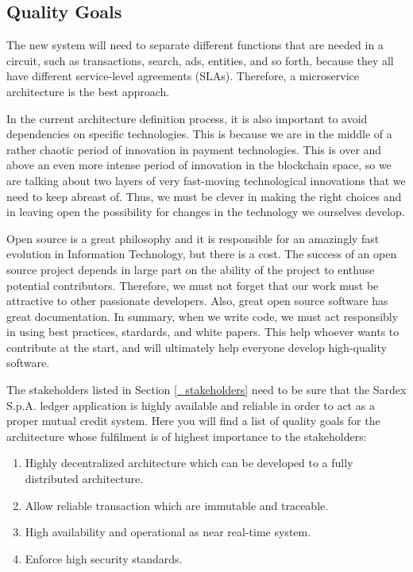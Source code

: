 \subsection{Quality Goals}\label{_quality_goals}
The new system will need to separate different functions that are needed in a circuit, such as transactions, search, ads, entities, and so forth, because they all have different service-level agreements (SLAs). Therefore, a microservice architecture is the best approach.

In the current architecture definition process, it is also important to avoid dependencies on specific technologies. This is because we are in the middle of a rather chaotic period of innovation in payment technologies. This is over and above an even more intense period of innovation in the blockchain space, so we are talking about two layers of very fast-moving technological innovations that we need to keep abreast of. Thus, we must be clever in making the right choices and in leaving open the possibility for changes in the technology we ourselves develop.

Open source is a great philosophy and it is responsible for an amazingly fast evolution in Information Technology, but there is a cost. The success of an open source project depends in large part on the ability of the project to enthuse potential contributors. Therefore, we must not forget that our work must be attractive to other passionate developers. Also, great open source software has great documentation. In summary, when we write code, we must act responsibly in using best practices, stardards, and white papers. This help whoever wants to contribute at the start, and will ultimately help everyone develop high-quality software.

The stakeholders listed in Section \ref{_stakeholders} need to be sure that the Sardex S.p.A. ledger application is highly available and reliable in order to act as a proper mutual credit system. Here you will find a list of quality goals for the architecture whose fulfilment is of highest importance to the stakeholders:

\begin{enumerate}
	\item Highly decentralized architecture which can be developed to a fully distributed architecture.
	\item Allow reliable transaction which are immutable and traceable.
	\item High availability and operational as near real-time system.
	\item Enforce high security standards.
\end{enumerate} 

